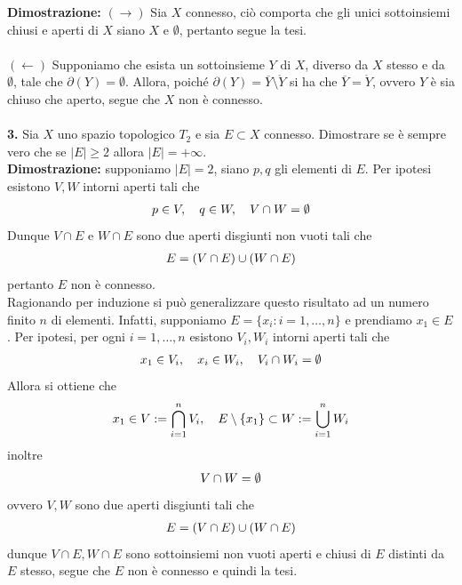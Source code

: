 \documentclass{article}
\begin{document}
\textbf{Dimostrazione:} $(\rightarrow)$ Sia $X$ connesso, ciò comporta che gli unici sottoinsiemi chiusi e aperti di $X$ siano $X$ e $\emptyset$, pertanto segue la tesi. \\ \\
$(\leftarrow)$ Supponiamo che esista un sottoinsieme $Y$ di $X$, diverso da $X$ stesso e da $\emptyset$, tale che $\partial(Y) = \emptyset$. Allora, poiché $\partial(Y) = \overline{Y} \setminus \mathring{Y}$ si ha che $\overline{Y} = \mathring{Y}$, ovvero $Y$ è sia chiuso che aperto, segue che $X$ non è connesso. \\ \\
\textbf{3.} Sia $X$ uno spazio topologico $T_2$ e sia $E \subset X$ connesso. Dimostrare se è sempre vero che se $|E| \geq 2$ allora $|E| = +\infty$. \\

\textbf{Dimostrazione:} supponiamo $|E| = 2$, siano $p, q$ gli elementi di $E$. Per ipotesi esistono $V, W$ intorni aperti tali che
\begin{gather}
    p \in V, \quad q \in W, \quad V \cap W = \emptyset \notag
\end{gather}
Dunque $V \cap E$ e $W \cap E$ sono due aperti disgiunti non vuoti tali che
\begin{gather}
    E = (V \cap E) \cup (W \cap E) \notag
\end{gather}
pertanto $E$ non è connesso. \\
Ragionando per induzione si può generalizzare questo risultato ad un numero finito $n$ di elementi. Infatti, supponiamo $E = \{ x_i : i = 1, \dots, n \}$ e prendiamo $x_1 \in E$. Per ipotesi, per ogni $i = 1, \dots, n$ esistono $V_i, W_i$ intorni aperti tali che
\begin{gather}
    x_1 \in V_i, \quad x_i \in W_i, \quad V_i \cap W_i = \emptyset \notag
\end{gather}
Allora si ottiene che
\begin{gather}
    x_1 \in V := \bigcap_{i = 1}^n V_i, \quad E \setminus \{ x_1 \} \subset W := \bigcup_{i = 1}^n W_i \notag
\end{gather}
inoltre
\begin{gather}
    V \cap W = \emptyset \notag
\end{gather}
ovvero $V, W$ sono due aperti disgiunti tali che
\begin{gather}
    E = (V \cap E) \cup (W \cap E) \notag
\end{gather}
dunque $V \cap E, W \cap E$ sono sottoinsiemi non vuoti aperti e chiusi di $E$ distinti da $E$ stesso, segue che $E$ non è connesso e quindi la tesi.
\end{document}
